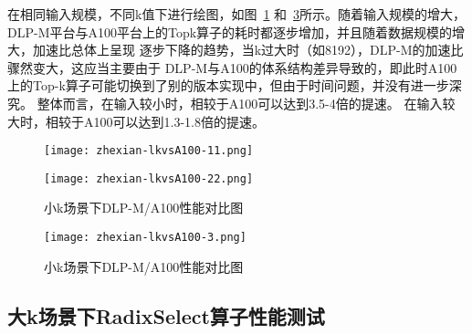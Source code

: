     在相同输入规模，不同k值下进行绘图，如图~\ref{fig:bench_littlek_vsa100_zhexian}
    和~\ref{fig:bench_littlek_vsa100_2_zhexian}所示。随着输入规模的增大，
    DLP-M平台与A100平台上的Topk算子的耗时都逐步增加，并且随着数据规模的增大，加速比总体上呈现
    逐步下降的趋势，当k过大时（如8192），DLP-M的加速比骤然变大，这应当主要由于
    DLP-M与A100的体系结构差异导致的，即此时A100上的Top-k算子可能切换到了别的版本实现中，但由于时间问题，并没有进一步深究。
    整体而言，在输入较小时，相较于A100可以达到3.5-4倍的提速。
    在输入较大时，相较于A100可以达到1.3-1.8倍的提速。

    \begin{figure}[ht]
        \centering
        \texttt{[image: zhexian-lkvsA100-11.png]}
        \label{fig:bench_littlek_vsa100_zhexian}
    \end{figure}
    
    \begin{figure}[ht]
        \centering
        \texttt{[image: zhexian-lkvsA100-22.png]}
        \caption{小k场景下DLP-M/A100性能对比图}
        \label{fig:bench_littlek_vsa100_2_zhexian}
    \end{figure}
    
    \begin{figure}[ht]
        \centering
        \texttt{[image: zhexian-lkvsA100-3.png]}
        \caption{小k场景下DLP-M/A100性能对比图}
        \label{fig:bench_littlek_vsa100_2_zhexian}
    \end{figure}
    

\subsection{大k场景下RadixSelect算子性能测试}

